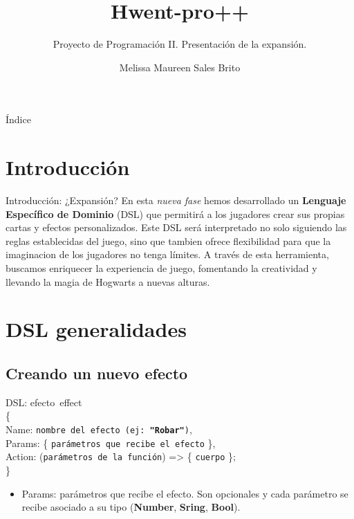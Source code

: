 \documentclass[a4paper, 12pt]{beamer}
\title{\textcolor{dorado}{Hwent}\textcolor{plata}{-pro++}}
\subtitle{Proyecto de Programación II. Presentación de la expansión.}
\author{Melissa Maureen Sales Brito}
\institute{MatCom}
\date{}
\begin{document}
\maketitle

\begin{frame}{\textcolor{plata}{Índice}}
\vspace{8pt}
\setcounter{tocdepth}{2}
\tableofcontents
\end{frame}

\section{Introducción}

\begin{frame}{\textcolor{plata}{Introducción: ¿Expansión?}}
En esta \textit{nueva fase} hemos desarrollado un \textbf{Lenguaje Específico de Dominio} (DSL) que permitirá a los jugadores crear sus propias cartas y efectos personalizados. Este DSL será interpretado no solo siguiendo las reglas establecidas del juego, sino que tambien ofrece flexibilidad para que la imaginacion de los jugadores no tenga límites. A través de esta herramienta, buscamos enriquecer la experiencia de juego, fomentando la creatividad y llevando la magia de Hogwarts a nuevas alturas.
\end{frame}

\section{DSL generalidades}
\subsection{Creando un nuevo efecto}
\begin{frame}{\textcolor{plata}{DSL: efecto}}\
effect\\
\{\\
	\hspace{1cm}  Name: \small \texttt{nombre del efecto (ej: \textbf{"Robar"})},\\
	\hspace{1cm}  Params: \{ \texttt{parámetros que recibe el efecto} \},\\
	\hspace{1cm}  Action: (\small \texttt{parámetros de la función}) => \{ \texttt{cuerpo} \};\\
\}\\
\vspace{0.6cm}
\begin{itemize}
\item Params: parámetros que recibe el efecto. Son opcionales y cada parámetro se recibe asociado a su tipo (\textbf{Number}, \textbf{Sring}, \textbf{Bool}).
\end{itemize}
\end{frame}
\end{document}
